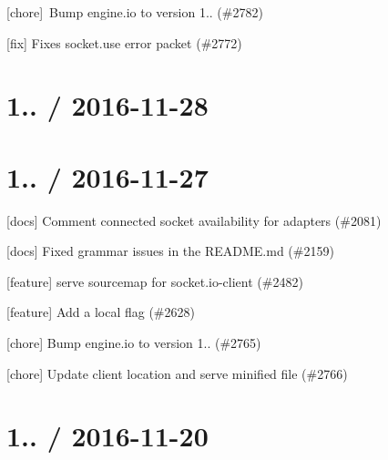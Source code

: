 
\begin{DoxyItemize}
\item \mbox{[}chore\mbox{]} \+Bump engine.\+io to version 1.. (\#2782)
\item \mbox{[}fix\mbox{]} Fixes socket.\+use error packet (\#2772)
\end{DoxyItemize}

\section*{1.. / 2016-\/11-\/28 }

\section*{1.. / 2016-\/11-\/27 }


\begin{DoxyItemize}
\item \mbox{[}docs\mbox{]} Comment connected socket availability for adapters (\#2081)
\item \mbox{[}docs\mbox{]} Fixed grammar issues in the R\+E\+A\+D\+M\+E.\+md (\#2159)
\item \mbox{[}feature\mbox{]} serve sourcemap for socket.\+io-\/client (\#2482)
\item \mbox{[}feature\mbox{]} Add a {\ttfamily local} flag (\#2628)
\item \mbox{[}chore\mbox{]} Bump engine.\+io to version 1.. (\#2765)
\item \mbox{[}chore\mbox{]} Update client location and serve minified file (\#2766)
\end{DoxyItemize}

\section*{1.. / 2016-\/11-\/20 }


